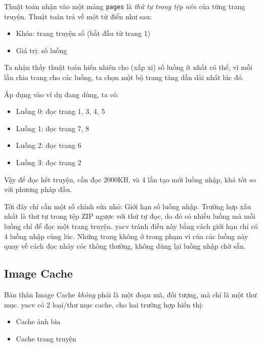 \documentclass[../../../../thesis]{subfiles}
\begin{document}
Thuật toán nhận vào một mảng \texttt{pages} là \emph{thứ tự trong tệp nén} của
từng trang truyện. Thuật toán trả về một từ điển như sau:

\begin{itemize}
    \item
        Khóa: trang truyện số (bắt đầu từ trang 1)
    \item
        Giá trị: số luồng
\end{itemize}

Ta nhận thấy thuật toán hiển nhiên cho (xấp xỉ) số luồng ít nhất có thể, vì mỗi
lần chia trang cho các luồng, ta chọn một bộ trang tăng dần dài nhất lúc đó.

Áp dụng vào ví dụ đang dùng, ta có:

\begin{itemize}
    \item
        Luồng 0: đọc trang 1, 3, 4, 5
    \item
        Luồng 1: đọc trang 7, 8
    \item
        Luồng 2: đọc trang 6
    \item
        Luồng 3: đọc trang 2
\end{itemize}

Vậy để đọc hết truyện, cần đọc 2000KB, và 4 lần tạo mới luồng nhập, khá tốt so
với phương pháp đầu.

Tới đây chỉ cần một số chỉnh sửa nhỏ: Giới hạn số luồng nhập. Trường hợp xấu
nhất là thứ tự trong tệp ZIP ngược với thứ tự đọc, do đó có nhiều luồng mà mỗi
luồng chỉ để đọc một trang truyện. yacv tránh điều này bằng cách giới hạn chỉ có
4 luồng nhập cùng lúc. Những trang không ở trong phạm vi của các luồng này quay
về cách đọc nhảy cóc thông thường, không dùng lại luồng nhập chờ sẵn.



\subsection{Image Cache}\label{sec:image-cache}

Bản thân Image Cache \emph{không} phải là một đoạn mã, đối tượng, mà chỉ là một
thư mục. yacv có 2 loại/thư mục cache, cho hai trường hợp hiển thị:

\begin{itemize}
    \item
        Cache ảnh bìa
    \item
        Cache trang truyện
\end{itemize}
\end{document}
